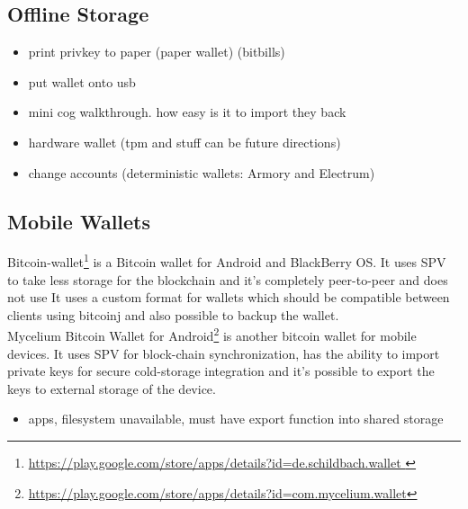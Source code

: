 
\subsection{Offline Storage}
\label{sec:offline storage}
\begin{itemize}
  \item print privkey to paper (paper wallet) (bitbills)
  \item put wallet onto usb
  \item mini cog walkthrough. how easy is it to import they back
  \item hardware wallet (tpm and stuff can be future directions)
  \item change accounts (\cf deterministic wallets: Armory and Electrum)
\end{itemize}
\subsection{Mobile Wallets}
Bitcoin-wallet\footnote{\url{https://play.google.com/store/apps/details?id=de.schildbach.wallet }} is a Bitcoin wallet for Android and BlackBerry OS. It uses SPV to take less storage for the blockchain and it's completely peer-to-peer and does not use It uses a custom format for wallets which should be compatible between clients using bitcoinj and also possible to backup the wallet.\\
Mycelium Bitcoin Wallet for Android\footnote{\url {https://play.google.com/store/apps/details?id=com.mycelium.wallet}} is another bitcoin wallet for mobile devices. It uses SPV for block-chain synchronization, has the ability to import private keys for secure cold-storage integration and it's possible to export the keys to external storage of the device. 



\begin{itemize}
  \item apps, filesystem unavailable, must have export function into shared storage
\end{itemize}
